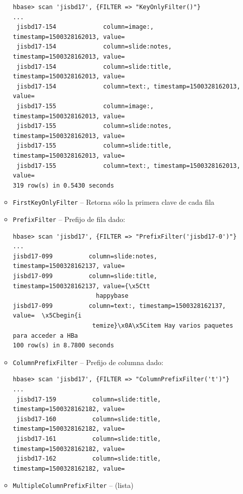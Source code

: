 \documentclass[14pt]{beamer}
\begin{document}
\begin{frame}
\begin{itemize}
\begin{frame}
\begin{itemize}
\begin{lstlisting}
hbase> scan 'jisbd17', {FILTER => "KeyOnlyFilter()"}
...
 jisbd17-154             column=image:, timestamp=1500328162013, value=
 jisbd17-154             column=slide:notes, timestamp=1500328162013, value=
 jisbd17-154             column=slide:title, timestamp=1500328162013, value=
 jisbd17-154             column=text:, timestamp=1500328162013, value=
 jisbd17-155             column=image:, timestamp=1500328162013, value=
 jisbd17-155             column=slide:notes, timestamp=1500328162013, value=
 jisbd17-155             column=slide:title, timestamp=1500328162013, value=
 jisbd17-155             column=text:, timestamp=1500328162013, value=
319 row(s) in 0.5430 seconds
\end{lstlisting}

\item {\tt FirstKeyOnlyFilter} -- Retorna sólo la primera clave de cada
  fila

  \framebreak

  \item {\tt PrefixFilter} -- Prefijo de fila dado:

    \begin{lstlisting}
hbase> scan 'jisbd17', {FILTER => "PrefixFilter('jisbd17-0')"}
...
jisbd17-099          column=slide:notes, timestamp=1500328162137, value=
jisbd17-099          column=slide:title, timestamp=1500328162137, value={\x5Ctt
                       happybase
jisbd17-099          column=text:, timestamp=1500328162137, value=  \x5Cbegin{i
                      temize}\x0A\x5Citem Hay varios paquetes para acceder a HBa
100 row(s) in 8.7800 seconds
\end{lstlisting}

  \item {\tt ColumnPrefixFilter} -- Prefijo de columna dado:

\begin{lstlisting}
hbase> scan 'jisbd17', {FILTER => "ColumnPrefixFilter('t')"}
...
 jisbd17-159          column=slide:title, timestamp=1500328162182, value=
 jisbd17-160          column=slide:title, timestamp=1500328162182, value=
 jisbd17-161          column=slide:title, timestamp=1500328162182, value=
 jisbd17-162          column=slide:title, timestamp=1500328162182, value=
\end{lstlisting}

    \framebreak

\item {\tt MultipleColumnPrefixFilter} -- (lista)


\end{itemize}
\end{frame}
\end{itemize}
\end{frame}
\end{document}
